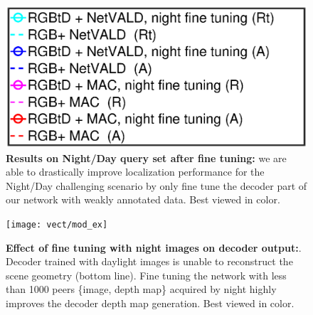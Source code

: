 \begin{figure}
	\includegraphics[trim={100 58 165 300},clip,width=0.4\linewidth]{plot/fig/legend_night}	
	\caption{\label{fig:ft_night} \textbf{Results on Night/Day query set after fine tuning:} we are able to drastically improve localization performance for the Night/Day challenging scenario by only fine tune the decoder part of our network with weakly annotated data. Best viewed in color.}
\end{figure}

\begin{figure}
	\center
	\texttt{[image: vect/mod\_ex]}	
	\caption{\label{fig:mod_ex} \textbf{Effect of fine tuning with night images on decoder output:}. Decoder trained with daylight images is unable to reconstruct the scene geometry (bottom line). Fine tuning the network with less than 1000 peers \{image, depth map\} acquired by night highly improves the decoder depth map generation. Best viewed in color.}
\end{figure}
